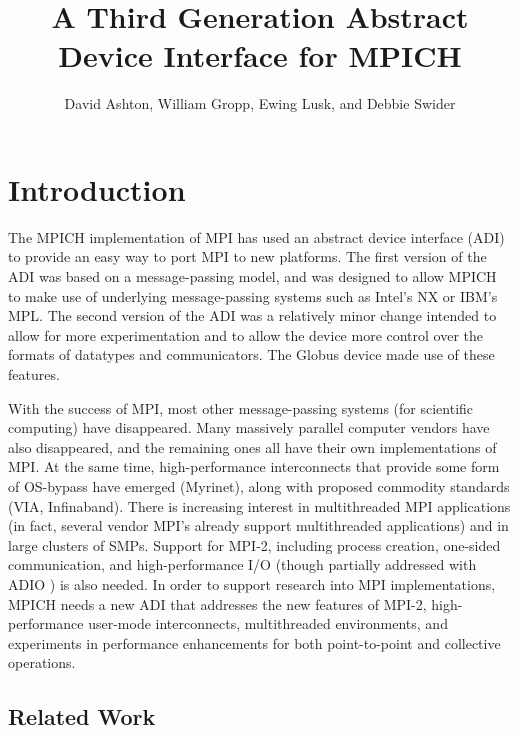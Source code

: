 \documentclass{article}
\begin{document}
\title{A Third Generation Abstract Device Interface for MPICH}
\author{David Ashton, William Gropp, Ewing Lusk, and Debbie Swider}
\maketitle

\pagestyle{plain}
{\parskip=0pt
\tableofcontents

\bigskip
}
\bigskip

\pagestyle{plain}
\clearpage

\setcounter{page}{1}


\section{Introduction}
The MPICH implementation of MPI has used an abstract device interface (ADI) to
provide an easy way to port MPI to new platforms.  The first version of the
ADI was based on a message-passing model, and was designed to allow MPICH to
make use of underlying message-passing systems such as Intel's NX or IBM's
MPL.  The second version of the ADI was a relatively minor change intended to
allow for more experimentation and to allow the device more control over the
formats of datatypes and communicators.  The Globus device \cite{mpich-globus}
made use of these features.

With the success of MPI, most other message-passing systems (for scientific
computing) have disappeared.  Many massively parallel computer vendors have
also disappeared, and the remaining ones all have their own implementations of
MPI.  At the same time, high-performance interconnects that provide some form
of OS-bypass have emerged (Myrinet), along with proposed commodity
standards (VIA, Infinaband).  There is increasing interest in multithreaded
MPI applications (in fact, several vendor MPI's already support multithreaded
applications) and in large clusters of SMPs.  Support for MPI-2, including
process creation, one-sided communication, and high-performance I/O (though
partially addressed with ADIO \cite{ADIO}) is also needed.
In order to support research
into MPI implementations, MPICH needs a new ADI that addresses the new
features of MPI-2, high-performance user-mode interconnects, multithreaded
environments, and experiments in performance enhancements for both
point-to-point and collective operations.  

\subsection{Related Work}
\end{document}
